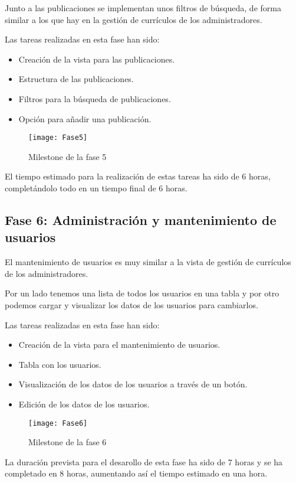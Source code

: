 Junto a las publicaciones se implementan unos filtros de búsqueda, de forma similar a los
que hay en la gestión de currículos de los administradores.

Las tareas realizadas en esta fase han sido:
\begin{itemize}
\tightlist
\item Creación de la vista para las publicaciones.
\item Estructura de las publicaciones.
\item Filtros para la búsqueda de publicaciones.
\item Opción para añadir una publicación.
\end{itemize}

\begin{figure}
    \centering
    \texttt{[image: Fase5]}
    \caption{Milestone de la fase 5}
\end{figure}

El tiempo estimado para la realización de estas tareas ha sido de 6 horas, completándolo todo
en un tiempo final de 6 horas.

\subsection{Fase 6: Administración y mantenimiento de usuarios}
El mantenimiento de usuarios es muy similar a la vista de gestión de currículos de los
administradores. 

Por un lado tenemos una lista de todos los usuarios en una tabla y por
otro podemos cargar y visualizar los datos de los usuarios para cambiarlos.

Las tareas realizadas en esta fase han sido:
\begin{itemize}
\tightlist
\item Creación de la vista para el mantenimiento de usuarios.
\item Tabla con los usuarios.
\item Visualización de los datos de los usuarios a través de un botón.
\item Edición de los datos de los usuarios.
\end{itemize}

\begin{figure}
    \centering
    \texttt{[image: Fase6]}
    \caption{Milestone de la fase 6}
\end{figure}

La duración prevista para el desarollo de esta fase ha sido de 7 horas y se ha completado en 8
horas, aumentando así el tiempo estimado en una hora.

